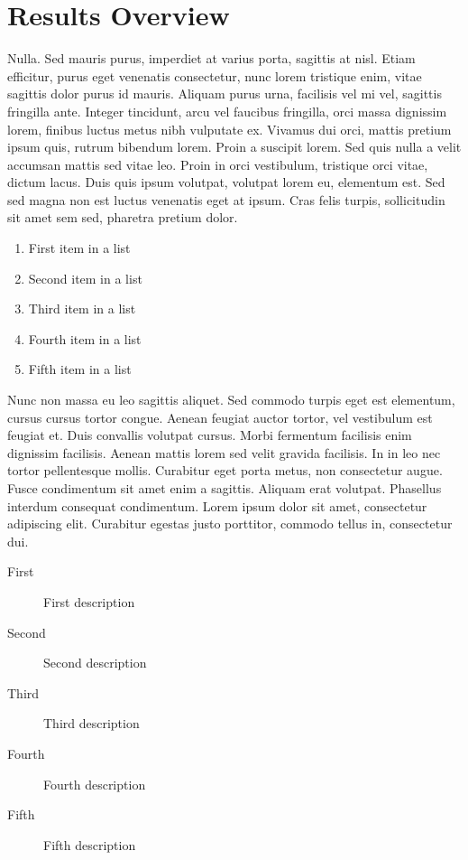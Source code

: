 \documentclass[
10pt, %
a4paper, %
twocolumn, %
landscape %
]{article}
\begin{document}

\section{Results Overview}

Nulla.  Sed mauris purus, imperdiet at varius porta, sagittis at nisl. Etiam efficitur, purus eget venenatis consectetur, nunc lorem tristique enim, vitae sagittis dolor purus id mauris. Aliquam purus urna, facilisis vel mi vel, sagittis fringilla ante. Integer tincidunt, arcu vel faucibus fringilla, orci massa dignissim lorem, finibus luctus metus nibh vulputate ex. Vivamus dui orci, mattis pretium ipsum quis, rutrum bibendum lorem. Proin a suscipit lorem. Sed quis nulla a velit accumsan mattis sed vitae leo. Proin in orci vestibulum, tristique orci vitae, dictum lacus. Duis quis ipsum volutpat, volutpat lorem eu, elementum est. Sed sed magna non est luctus venenatis eget at ipsum. Cras felis turpis, sollicitudin sit amet sem sed, pharetra pretium dolor.

\begin{enumerate}
\item First item in a list
\item Second item in a list
\item Third item in a list
\item Fourth item in a list
\item Fifth item in a list
\end{enumerate}

Nunc non massa eu leo sagittis aliquet. Sed commodo turpis eget est elementum, cursus cursus tortor congue. Aenean feugiat auctor tortor, vel vestibulum est feugiat et. Duis convallis volutpat cursus. Morbi fermentum facilisis enim dignissim facilisis. Aenean mattis lorem sed velit gravida facilisis. In in leo nec tortor pellentesque mollis. Curabitur eget porta metus, non consectetur augue. Fusce condimentum sit amet enim a sagittis. Aliquam erat volutpat. Phasellus interdum consequat condimentum. Lorem ipsum dolor sit amet, consectetur adipiscing elit. Curabitur egestas justo porttitor, commodo tellus in, consectetur dui.

\begin{description}
\item[First] First description
\item[Second] Second description
\item[Third] Third description
\item[Fourth] Fourth description
\item[Fifth] Fifth description
\end{description}
\end{document}
